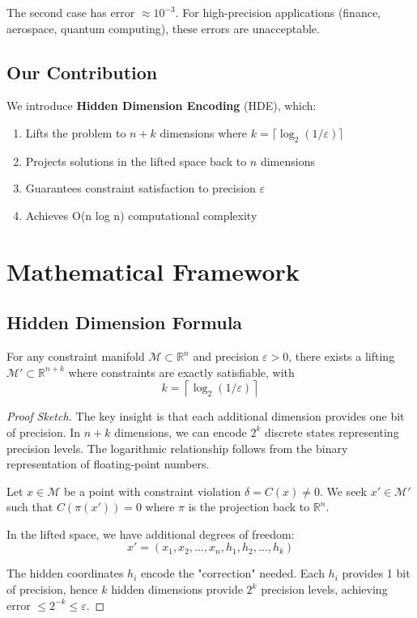 \documentclass{article}
\begin{document}
The second case has error $\approx 10^{-3}$. For high-precision applications (finance, aerospace, quantum computing), these errors are unacceptable.

\subsection{Our Contribution}

We introduce \textbf{Hidden Dimension Encoding} (HDE), which:

\begin{enumerate}
    \item Lifts the problem to $n + k$ dimensions where $k = \lceil \log_2(1/\varepsilon) \rceil$
    \item Projects solutions in the lifted space back to $n$ dimensions
    \item Guarantees constraint satisfaction to precision $\varepsilon$
    \item Achieves O(n log n) computational complexity
\end{enumerate}

\section{Mathematical Framework}

\subsection{Hidden Dimension Formula}

\begin{theorem}
For any constraint manifold $\mathcal{M} \subset \mathbb{R}^n$ and precision $\varepsilon > 0$, there exists a lifting $\mathcal{M}' \subset \mathbb{R}^{n+k}$ where constraints are exactly satisfiable, with
\begin{equation}
k = \left\lceil \log_2(1/\varepsilon) \right\rceil
\end{equation}
\end{theorem}

\begin{proof}[Proof Sketch]
The key insight is that each additional dimension provides one bit of precision. In $n+k$ dimensions, we can encode $2^k$ discrete states representing precision levels. The logarithmic relationship follows from the binary representation of floating-point numbers.

Let $x \in \mathcal{M}$ be a point with constraint violation $\delta = C(x) \neq 0$. We seek $x' \in \mathcal{M}'$ such that $C(\pi(x')) = 0$ where $\pi$ is the projection back to $\mathbb{R}^n$.

In the lifted space, we have additional degrees of freedom:
\begin{equation}
x' = (x_1, x_2, \ldots, x_n, h_1, h_2, \ldots, h_k)
\end{equation}

The hidden coordinates $h_i$ encode the "correction" needed. Each $h_i$ provides 1 bit of precision, hence $k$ hidden dimensions provide $2^k$ precision levels, achieving error $\leq 2^{-k} \leq \varepsilon$.
\end{proof}
\end{document}
